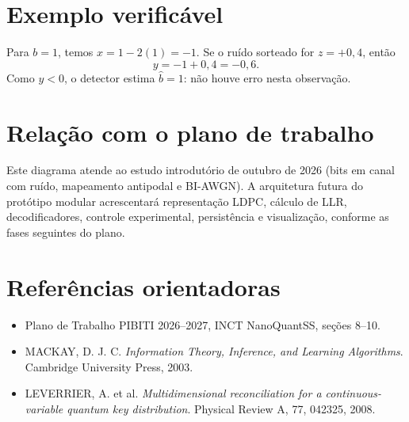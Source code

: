 \documentclass[12pt,openright,oneside,a4paper,english,brazil]{abntex2}
\begin{document}
\chapter{Exemplo verificável}
Para $b=1$, temos $x=1-2(1)=-1$. Se o ruído sorteado for $z=+0{,}4$, então
\begin{equation}
y=-1+0{,}4=-0{,}6.
\end{equation}
Como $y<0$, o detector estima $\hat b=1$: não houve erro nesta observação.

\chapter{Relação com o plano de trabalho}
Este diagrama atende ao estudo introdutório de outubro de 2026 (bits em canal com ruído, mapeamento antipodal e BI-AWGN). A arquitetura futura do protótipo modular acrescentará representação LDPC, cálculo de LLR, decodificadores, controle experimental, persistência e visualização, conforme as fases seguintes do plano.

\chapter{Referências orientadoras}
\begin{itemize}
\item Plano de Trabalho PIBITI 2026--2027, INCT NanoQuantSS, seções 8--10.
\item MACKAY, D. J. C. \textit{Information Theory, Inference, and Learning Algorithms}. Cambridge University Press, 2003.
\item LEVERRIER, A. et al. \textit{Multidimensional reconciliation for a continuous-variable quantum key distribution}. Physical Review A, 77, 042325, 2008.
\end{itemize}
\end{document}

